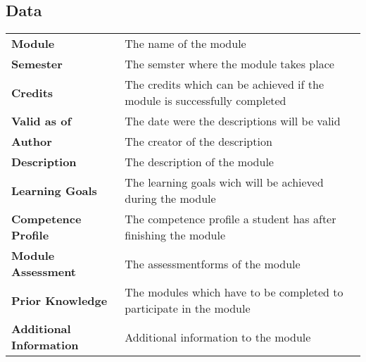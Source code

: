     \subsection{Data}
    \begin{table}[H]
        \begin{tabular}{p{} p{}}
            \textbf{Module} & The name of the module \\
            \textbf{Semester} & The semster where the module takes place \\ 
            \textbf{Credits} & The credits which can be achieved \newline if the module is successfully completed \\
            \textbf{Valid as of} & The date were the descriptions will be valid \\
            \textbf{Author} & The creator of the description \\
            \textbf{Description} & The description of the module \\
            \textbf{Learning Goals} & The learning goals wich will be achieved during the module \\
            \textbf{Competence Profile} & The competence profile a student has after finishing the module \\
            \textbf{Module Assessment} & The assessmentforms of the module \\
            \textbf{Prior Knowledge} & The modules which have to be \newline completed to participate in the module \\
            \textbf{Additional Information} & Additional information to the module
        \end{tabular}
    \end{table}
    \pagebreak
